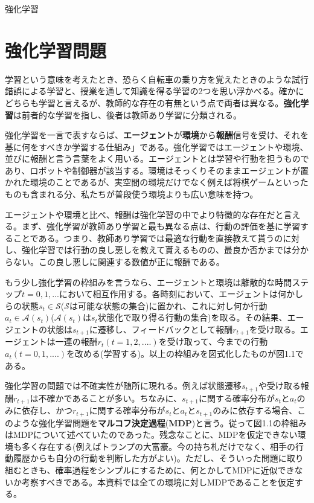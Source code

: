 \documentclass[dvipdfmx, 9pt, a4paper]{jsarticle}
\numberwithin{equation}{section}
\begin{document}
\begin{center}
{\fontsize{18pt}{1pt}\selectfont 強化学習}\\
\end{center}
\section{強化学習問題}
学習という意味を考えたとき、恐らく自転車の乗り方を覚えたときのような試行錯誤による学習と、授業を通して知識を得る学習の2つを思い浮かべる。確かにどちらも学習と言えるが、教師的な存在の有無という点で両者は異なる。{\bf 強化学習}は前者的な学習を指し、後者は教師あり学習に分類される。\par
強化学習を一言で表すならば、{\bf エージェント}が{\bf 環境}から{\bf 報酬}信号を受け、それを基に何をすべきか学習する仕組み」である。強化学習ではエージェントや環境、並びに報酬と言う言葉をよく用いる。エージェントとは学習や行動を担うものであり、ロボットや制御器が該当する。環境はそっくりそのままエージェントが置かれた環境のことであるが、実空間の環境だけでなく例えば将棋ゲームといったものも含まれる分、私たちが普段使う環境よりも広い意味を持つ。\par
エージェントや環境と比べ、報酬は強化学習の中でより特徴的な存在だと言える。まず、強化学習が教師あり学習と最も異なる点は、行動の評価を基に学習することである。つまり、教師あり学習では最適な行動を直接教えて貰うのに対し、強化学習では行動の良し悪しを教えて貰えるものの、最良か否かまでは分からない。この良し悪しに関連する数値が正に報酬である。\par
もう少し強化学習の枠組みを言うなら、エージェントと環境は離散的な時間ステップ$t=0, 1, ...$において相互作用する。各時刻において、エージェントは何かしらの状態$s_t \in \mathcal{S}$($\mathcal{S}$は可能な状態の集合)に置かれ、これに対し何か行動$a_t \in \mathcal{A}(s_t)$($\mathcal{A}(s_t)$は$s_t$状態化で取り得る行動の集合)を取る。その結果、エージェントの状態は$s_{t+1}$に遷移し、フィードバックとして報酬$r_{t+1}$を受け取る。エージェントは一連の報酬$r_t(t=1, 2, ....)$を受け取って、今までの行動$a_t(t=0, 1, ....)$を改める(学習する)。以上の枠組みを図式化したものが図1.1である。\par
強化学習の問題では不確実性が随所に現れる。例えば状態遷移$s_{t+1}$や受け取る報酬$r_{t+1}$は不確かであることが多い。ちなみに、$s_{t+1}$に関する確率分布が$s_t$と$a_t$のみに依存し、かつ$r_{t+1}$に関する確率分布が$s_t$と$a_t$と$s_{t+1}$のみに依存する場合、このような強化学習問題を{\bf マルコフ決定過程}({\bf MDP})と言う。従って図1.1の枠組みはMDPについて述べていたのであった。残念なことに、MDPを仮定できない環境も多く存在する(例えばトランプの大富豪。今の持ち札だけでなく、相手の行動履歴からも自分の行動を判断した方がよい)。ただし、そういった問題に取り組むときも、確率過程をシンプルにするために、何とかしてMDPに近似できないか考察すべきである。本資料では全ての環境に対しMDPであることを仮定する。\par
\end{document}
